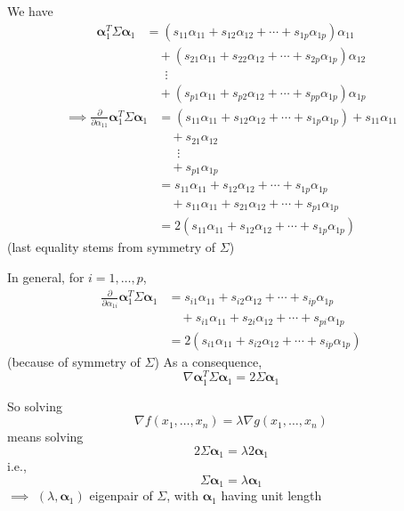 \documentclass[aspectratio=169]{beamer}\usepackage[]{graphicx}\usepackage[]{xcolor}
\begin{document}
\begin{frame}
We have
\begin{align*}
\bm{\alpha}_1^T\Sigma\bm{\alpha}_1 &=
(s_{11}\alpha_{11}+s_{12}\alpha_{12}+\cdots+s_{1p}\alpha_{1p})\alpha_{11} \\
&\quad +
(s_{21}\alpha_{11}+s_{22}\alpha_{12}+\cdots+s_{2p}\alpha_{1p})\alpha_{12} \\
&\quad\;\;\vdots \\
&\quad +
(s_{p1}\alpha_{11}+s_{p2}\alpha_{12}+\cdots+s_{pp}\alpha_{1p})\alpha_{1p} 
\end{align*}
\begin{align*}
\implies\frac{\partial}{\partial \alpha_{11}}
\bm{\alpha}_1^T\Sigma\bm{\alpha}_1  
&= 
(s_{11}\alpha_{11}+s_{12}\alpha_{12}+\cdots+s_{1p}\alpha_{1p})+s_{11}\alpha_{11} \\
&\quad +
s_{21}\alpha_{12} \\
&\quad\;\;\vdots \\
&\quad +
s_{p1}\alpha_{1p} \\
&= s_{11}\alpha_{11}+s_{12}\alpha_{12}+\cdots+s_{1p}\alpha_{1p} \\
&\quad+
s_{11}\alpha_{11}+s_{21}\alpha_{12}+\cdots+s_{p1}\alpha_{1p} \\
&= 2(s_{11}\alpha_{11}+s_{12}\alpha_{12}+\cdots+s_{1p}\alpha_{1p})
\end{align*}
(last equality stems from symmetry of $\Sigma$)
\end{frame}

\begin{frame}
In general, for $i=1,\ldots,p$,
\begin{align*}
\frac{\partial}{\partial \alpha_{1i}}
\bm{\alpha}_1^T\Sigma\bm{\alpha}_1  
&= s_{i1}\alpha_{11}+s_{i2}\alpha_{12}+\cdots+s_{ip}\alpha_{1p}\\
&\quad+s_{i1}\alpha_{11}+s_{2i}\alpha_{12}+\cdots+s_{pi}\alpha_{1p} \\
&= 2(s_{i1}\alpha_{11}+s_{i2}\alpha_{12}+\cdots+s_{ip}\alpha_{1p})
\end{align*}
(because of symmetry of $\Sigma$)
\vfill
As a consequence,
\[
\nabla \bm{\alpha}_1^T\Sigma\bm{\alpha}_1
=2\Sigma\bm{\alpha}_1
\]
\end{frame}

\begin{frame}
So solving
\[
\nabla f(x_1,\ldots,x_n) = \lambda\nabla g(x_1,\ldots,x_n) 
\]
means solving
\[
2\Sigma\bm{\alpha}_1 = \lambda 2\bm{\alpha}_1 
\]
i.e.,
\[
\Sigma\bm{\alpha}_1 = \lambda\bm{\alpha}_1 
\]
\vfill
$\implies$
$(\lambda,\bm{\alpha}_1)$ eigenpair of $\Sigma$, with $\bm{\alpha}_1$ having unit length
\end{frame}
\end{document}

